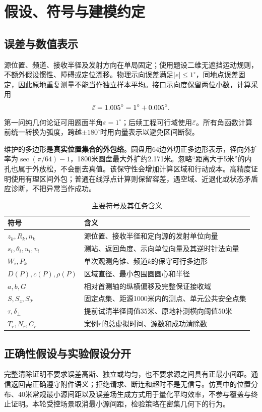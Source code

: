 \documentclass[UTF8,a4paper,zihao=-4,fontset=mac]{ctexart}
\begin{document}
\section{假设、符号与建模约定}
\subsection{误差与数值表示}
源位置、频道、接收半径及发射方向在单局固定；使用题设二维无遮挡运动规则，不额外假设惯性、障碍或定位漂移。物理示向误差满足$|e|\le1^\circ$，同地点误差固定，因此原地重复测量不能当作独立样本平均。接口示向度保留两位小数，计算采用
\begin{equation}\bar\varepsilon=1.005^\circ=1^\circ+0.005^\circ.
\end{equation}
第一问纯几何论证可用题面半角$\varepsilon=1^\circ$；后续工程可行域使用$\bar\varepsilon$。所有角函数计算前统一转换为弧度，跨越$\pm180^\circ$时用向量表示以避免区间断裂。

维护的多边形是\textbf{真实位置集合的外包络}。圆盘用64边外切正多边形表示，径向外扩率为$\sec(\pi/64)-1$，1800米圆盘最大外扩约2.171米。忽略“距离大于5米”的内孔也属于外放松，不会删去真值。该保守性会增加计算区域和行动成本。高精度证明使用有理区间外包；普通在线浮点计算则保留容差，遇空域、近退化或状态矛盾应诊断，不把异常当作成功。

\begin{table}[H]\centering\small
\caption{主要符号及其任务含义}\label{tab:notation}
\begin{tabular}{p{3cm}p{10.8cm}}\toprule
符号 & 含义\\\midrule
$z_k,R_k,n_k$ & 源位置、接收半径和定向源的发射单位向量\\
$s_i,\theta_i,u_i,v_i$ & 测站、返回角度、示向单位向量及其逆时针法向量\\
$W_i,P_k$ & 单次观测角锥、频道$k$的保守可行多边形\\
$D(P),c(P),\rho(P)$ & 区域直径、最小包围圆圆心和半径\\
$a,b,G$ & 相对首测轴的纵横偏移及完整保证接收域\\
$S,S_z,S_{\mathcal T}$ & 固定点集、距源1000米内的测点、单元公共安全点集\\
$\tau,\delta_\perp$ & 提前试清半径阈值35米、原地补测横向阈值50米\\
$T_r,N_r,C_r$ & 案例$r$的总虚拟时间、源数和成功清除数\\\bottomrule
\end{tabular}
\end{table}

\subsection{正确性假设与实验假设分开}
完整清除证明不要求误差高斯、独立或均匀，也不要求源之间具有正最小间距。通信返回需正确遵守附件语义；拒绝请求、断连和超时不是无信号。仿真中的位置分布、40米常规最小源间距以及误差场生成方式用于量化平均效率，不参与覆盖与终止证明。本轮受控场景取消最小源间距，检验策略在密集几何下的行为。
\end{document}
